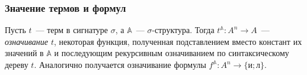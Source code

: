 \subsubsection{Значение термов и формул}

\begin{definition}
	Пусть $t$~— терм в сигнатуре $\sigma$, а $\mathbb{A}$~— $\sigma$-структура. Тогда $t^{\mathbb{A}}: A^n \to A$~— \emph{означивание $t$}, некоторая функция, полученная подставлением вместо констант их значений в $\mathbb{A}$ и последующим рекурсивным означиванием по синтаксическому дереву $t$. Аналогично получается означивание формулы $f^{\mathbb{A}}: A^n \to \{\text{и}; \text{л}\}$.
\end{definition}
